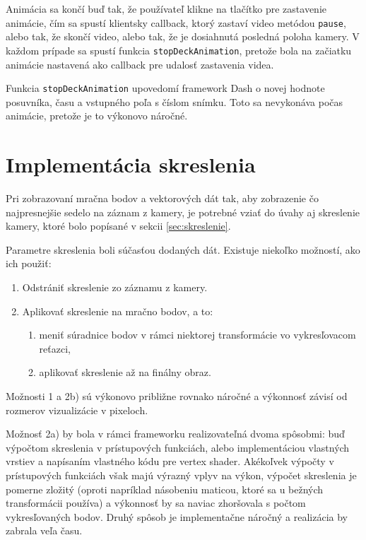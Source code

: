 Animácia sa končí buď tak, že používateľ klikne na tlačítko pre zastavenie animácie, čím sa spustí klientsky callback, ktorý zastaví video metódou \texttt{pause}, alebo tak, že skončí video, alebo tak, že je dosiahnutá posledná poloha kamery. V každom prípade sa spustí funkcia \texttt{stopDeckAnimation}, pretože bola na začiatku animácie nastavená ako callback pre udalosť zastavenia videa.

Funkcia \texttt{stopDeckAnimation} upovedomí framework Dash o novej hodnote posuvníka, času a vstupného poľa s číslom snímku. Toto sa nevykonáva počas animácie, pretože je to výkonovo náročné.

\section{Implementácia skreslenia}
\label{sec:implementacia_skreslenia}

Pri zobrazovaní mračna bodov a vektorových dát tak, aby zobrazenie čo najpresnejšie sedelo na záznam z kamery, je potrebné vziať do úvahy aj skreslenie kamery, ktoré bolo popísané v sekcii \ref{sec:skreslenie}. 

Parametre skreslenia boli súčasťou dodaných dát. Existuje niekoľko možností, ako ich použiť:
\begin{enumerate}
    \item Odstrániť skreslenie zo záznamu z kamery.
    \item Aplikovať skreslenie na mračno bodov, a to:
    \begin{enumerate}
        \item meniť súradnice bodov v rámci niektorej transformácie vo vykresľovacom reťazci,
        \item aplikovať skreslenie až na finálny obraz.
    \end{enumerate}
\end{enumerate}

Možnosti 1 a 2b) sú výkonovo približne rovnako náročné a výkonnosť závisí od rozmerov vizualizácie v pixeloch.

Možnosť 2a) by bola v rámci frameworku realizovateľná dvoma spôsobmi: buď výpočtom skreslenia v prístupových funkciách, alebo implementáciou vlastných vrstiev a napísaním vlastného kódu pre vertex shader. Akékoľvek výpočty v prístupových funkciách však majú výrazný vplyv na výkon, výpočet skreslenia je pomerne zložitý (oproti napríklad násobeniu maticou, ktoré sa u bežných transformácii používa) a výkonnosť by sa naviac zhoršovala s počtom vykresľovaných bodov. Druhý spôsob je implementačne náročný a realizácia by zabrala veľa času.

